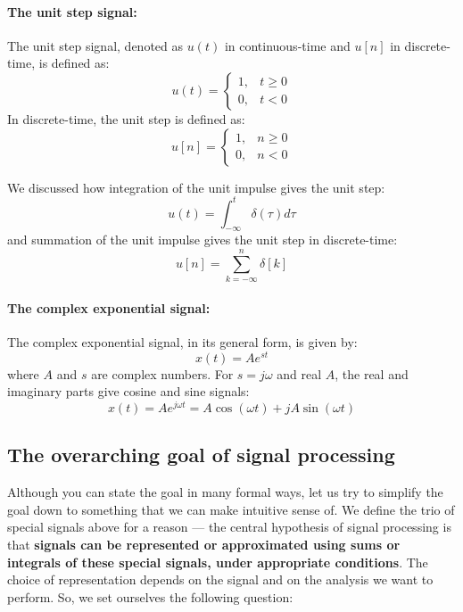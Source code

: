 \paragraph{The unit step signal:} The unit step signal, denoted as $u(t)$ in continuous-time and $u[n]$ in discrete-time, is defined as:
\[
u(t) = \begin{cases}
1, & t \geq 0 \\
0, & t < 0
\end{cases}
\]
In discrete-time, the unit step is defined as:
\[
u[n] = \begin{cases}
1, & n \geq 0 \\
0, & n < 0
\end{cases}
\]

We discussed how integration of the unit impulse gives the unit step:
\[
u(t) = \int_{-\infty}^{t} \delta(\tau) d\tau
\]
and summation of the unit impulse gives the unit step in discrete-time:
\[
u[n] = \sum_{k=-\infty}^{n} \delta[k]
\]

\paragraph{The complex exponential signal:} The complex exponential signal, in its general form, is given by:
\[
x(t) = Ae^{st}
\]
where $A$ and $s$ are complex numbers. For $s=j\omega$ and real $A$, the real and imaginary parts give cosine and sine signals:
\[
x(t) = Ae^{j\omega t} = A\cos(\omega t) + jA\sin(\omega t)
\]

\subsection{The overarching goal of signal processing}
Although you can state the goal in many formal ways, let us try to simplify the goal down to something that we can make intuitive sense of. We define the trio of special signals above for a reason --- the central hypothesis of signal processing is that \textbf{signals can be represented or approximated using sums or integrals of these special signals, under appropriate conditions}. The choice of representation depends on the signal and on the analysis we want to perform. So, we set ourselves the following question:

\begin{center}\end{center}

